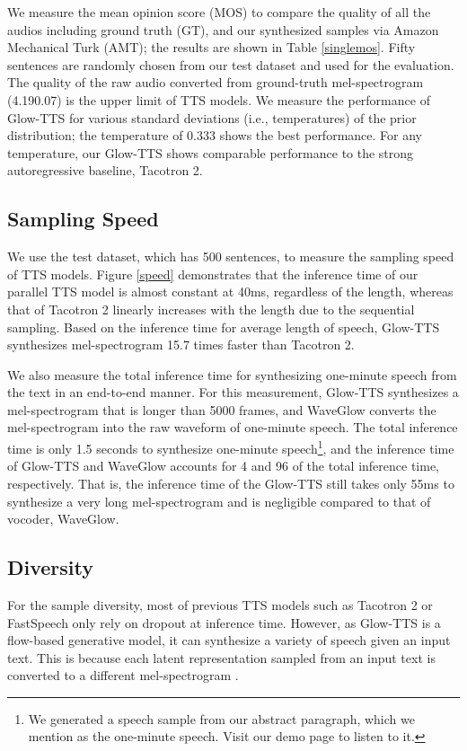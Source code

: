 \documentclass{article}
\begin{document}
We measure the mean opinion score (MOS) to compare the quality of all the audios including ground truth (GT), and our synthesized samples via Amazon Mechanical Turk (AMT); the results are shown in Table \ref{singlemos}. Fifty sentences are randomly chosen from our test dataset and used for the evaluation. The quality of the raw audio converted from ground-truth mel-spectrogram (4.190.07) is the upper limit of TTS models. We measure the performance of Glow-TTS for various standard deviations (i.e., temperatures) of the prior distribution; the temperature of 0.333 shows the best performance. For any temperature, our Glow-TTS shows comparable performance to the strong autoregressive baseline, Tacotron 2.

\subsection{Sampling Speed}

We use the test dataset, which has 500 sentences, to measure the sampling speed of TTS models. Figure \ref{speed} demonstrates that the inference time of our parallel TTS model is almost constant at 40ms, regardless of the length, whereas that of Tacotron 2 linearly increases with the length due to the sequential sampling. Based on the inference time for average length of speech, Glow-TTS synthesizes mel-spectrogram 15.7 times faster than Tacotron 2.

We also measure the total inference time for synthesizing one-minute speech from the text in an end-to-end manner. For this measurement, Glow-TTS synthesizes a mel-spectrogram that is longer than 5000 frames, and WaveGlow converts the mel-spectrogram into the raw waveform of one-minute speech. The total inference time is only 1.5 seconds to synthesize one-minute speech\footnote{We generated a speech sample from our abstract paragraph, which we mention as the one-minute speech. Visit our demo page to listen to it.}, and the inference time of Glow-TTS and WaveGlow accounts for 4 and 96 of the total inference time, respectively. That is, the inference time of the Glow-TTS still takes only 55ms to synthesize a very long mel-spectrogram and is negligible compared to that of vocoder, WaveGlow.

\subsection{Diversity}
\label{diversity}

For the sample diversity, most of previous TTS models such as Tacotron 2 or FastSpeech only rely on dropout at inference time. However, as Glow-TTS is a flow-based generative model, it can synthesize a variety of speech given an input text. This is because each latent representation  sampled from an input text is converted to a different mel-spectrogram . 
\end{document}
